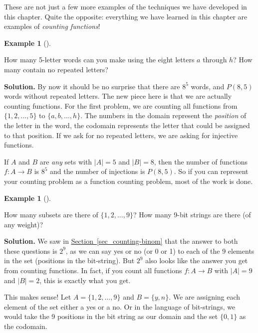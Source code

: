 \documentclass[10pt,]{book}
\theoremstyle{plain}
\theoremstyle{definition}
\newtheorem{example}[theorem]{Example}
\theoremstyle{definition}
\theoremstyle{definition}
\numberwithin{equation}{section}
\begin{document}
    These are not just a few more examples of the techniques we have developed in this chapter. Quite the opposite: everything we have learned in this chapter are examples of \emph{counting functions}!
\begin{example}[]\label{example-55}

    How many 5-letter words can you make using the eight letters \(a\) through \(h\)? How many contain no repeated letters?
\par\medskip\noindent%
\textbf{Solution.}\quad 
    By now it should be no surprise that there are \(8^5\) words, and \(P(8,5)\) words without repeated letters. The new piece here is that we are actually counting functions. For the first problem, we are counting all functions from \(\{1,2,\ldots, 5\}\) to \(\{a,b,\ldots, h\}\). The numbers in the domain represent the \emph{position} of the letter in the word, the codomain represents the letter that could be assigned to that position. If we ask for no repeated letters, we are asking for injective functions.
\par

    If \(A\) and \(B\) are \emph{any} sets with \(|A| = 5\) and \(|B| = 8\), then the number of functions \(f: A \to B\) is \(8^5\) and the number of injections is \(P(8,5)\). So if you can represent your counting problem as a function counting problem, most of the work is done.
\end{example}
\begin{example}[]\label{example-56}

    How many subsets are there of \(\{1,2,\ldots, 9\}\)? How many 9-bit strings are there (of any weight)?
\par\medskip\noindent%
\textbf{Solution.}\quad 
    We saw in \hyperref[sec_counting-binom]{Section~\ref{sec_counting-binom}} that the answer to both these questions is \(2^9\), as we can say yes or no (or 0 or 1) to each of the 9 elements in the set (positions in the bit-string). But \(2^9\) also looks like the answer you get from counting functions. In fact, if you count all functions \(f: A \to B\) with \(|A| = 9\) and \(|B| = 2\), this is exactly what you get.
\par

    This makes sense! Let \(A = \{1,2,\ldots, 9\}\) and \(B = \{y, n\}\). We are assigning each element of the set either a yes or a no. Or in the language of bit-strings, we would take the 9 positions in the bit string as our domain and the set \(\{0,1\}\) as the codomain.
\end{example}
\par
\end{document}
